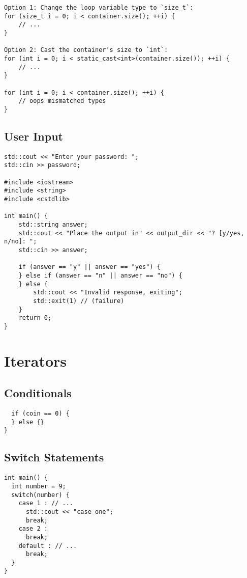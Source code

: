 \begin{verbatim}
Option 1: Change the loop variable type to `size_t`:
for (size_t i = 0; i < container.size(); ++i) {
    // ...
}

Option 2: Cast the container's size to `int`:
for (int i = 0; i < static_cast<int>(container.size()); ++i) {
    // ...
}

for (int i = 0; i < container.size(); ++i) {
    // oops mismatched types
}
\end{verbatim}


\subsection{User Input}

\begin{verbatim}
std::cout << "Enter your password: ";
std::cin >> password;

#include <iostream>
#include <string>
#include <cstdlib>

int main() {
    std::string answer;
    std::cout << "Place the output in" << output_dir << "? [y/yes, n/no]: ";
    std::cin >> answer;

    if (answer == "y" || answer == "yes") {
    } else if (answer == "n" || answer == "no") {
    } else {
        std::cout << "Invalid response, exiting";
        std::exit(1) // (failure)
    }
    return 0;
}
\end{verbatim}

\section{Iterators}
\subsection{Conditionals}

\begin{verbatim}
  if (coin == 0) {
  }	else {}
}
\end{verbatim}

\subsection{Switch Statements}

\begin{verbatim}
int main() {
  int number = 9;
  switch(number) {
    case 1 : // ...
      std::cout << "case one";
      break;
    case 2 :
      break;
    default : // ...
      break;
  }
}
\end{verbatim}

